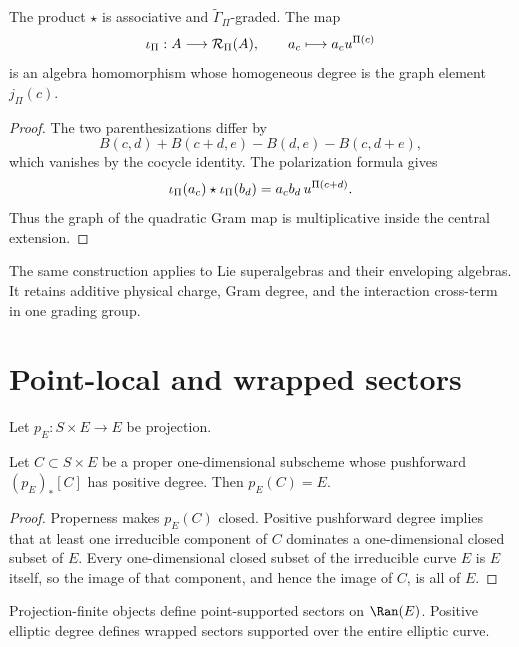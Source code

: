 \begin{theorem}
The product $\star$ is associative and $\widetilde\Gamma_\Pi$-graded. The map
\[
 \iota_\Pi:A\longrightarrow\mathcal R_\Pi(A),
 \qquad a_c\longmapsto a_cu^{\Pi(c)}
\]
is an algebra homomorphism whose homogeneous degree is the graph element $j_\Pi(c)$.
\end{theorem}
\begin{proof}
The two parenthesizations differ by
\[
 B(c,d)+B(c+d,e)-B(d,e)-B(c,d+e),
\]
which vanishes by the cocycle identity. The polarization formula gives
\[
 \iota_\Pi(a_c)\star\iota_\Pi(b_d)
 =a_cb_d\,u^{\Pi(c+d)}.
\]
Thus the graph of the quadratic Gram map is multiplicative inside the central extension.
\end{proof}

The same construction applies to Lie superalgebras and their enveloping algebras. It retains additive physical charge, Gram degree, and the interaction cross-term in one grading group.

\chapter{Point-local and wrapped sectors}
Let $p_E:S\times E\to E$ be projection.

\begin{lemma}
Let $C\subset S\times E$ be a proper one-dimensional subscheme whose pushforward $(p_E)_*[C]$ has positive degree. Then $p_E(C)=E$.
\end{lemma}
\begin{proof}
Properness makes $p_E(C)$ closed. Positive pushforward degree implies that at least one irreducible component of $C$ dominates a one-dimensional closed subset of $E$. Every one-dimensional closed subset of the irreducible curve $E$ is $E$ itself, so the image of that component, and hence the image of $C$, is all of $E$.
\end{proof}

Projection-finite objects define point-supported sectors on $\Ran(E)$. Positive elliptic degree defines wrapped sectors supported over the entire elliptic curve.


